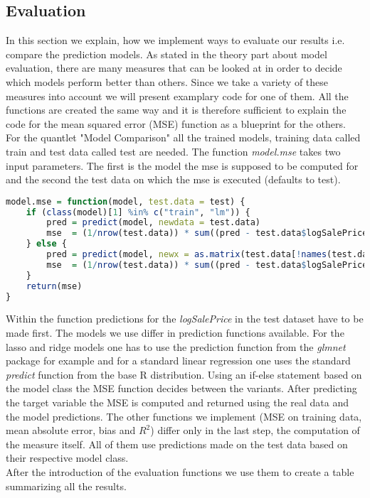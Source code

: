 \subsection{Evaluation}
In this section we explain, how we implement ways to evaluate our results i.e. compare the prediction models. As stated in the theory part about model evaluation, there are many measures that can be looked at in order to decide which models perform better than others. Since we take a variety of these measures into account we will present examplary code for one of them. All the functions are created the same way and it is therefore sufficient to explain the code for the mean squared error (MSE) function as a blueprint for the others. \\
For the quantlet "Model Comparison" all the trained models, training data called train and test data called test are needed. The function \textit{model.mse} takes two input parameters. The first is the model the mse is supposed to be computed for and the second the test data on which the mse is executed (defaults to test). 
\begin{lstlisting}[language=R]
model.mse = function(model, test.data = test) {
    if (class(model)[1] %in% c("train", "lm")) {
        pred = predict(model, newdata = test.data)
        mse  = (1/nrow(test.data)) * sum((pred - test.data$logSalePrice)^2)
    } else {
        pred = predict(model, newx = as.matrix(test.data[!names(test.data) %in% "logSalePrice"]), s = "lambda.1se")
        mse  = (1/nrow(test.data)) * sum((pred - test.data$logSalePrice)^2)
    }
    return(mse)
}
\end{lstlisting}
Within the function predictions for the \textit{logSalePrice} in the test dataset have to be made first. The models we use differ in prediction functions available. For the lasso and ridge models one has to use the prediction function from the \textit{glmnet} package for example and for a standard linear regression one uses the standard \textit{predict} function from the base \textsf{R} distribution. Using an if-else statement based on the model class the MSE function decides between the variants. After predicting the target variable the MSE is computed and returned using the real data and the model predictions. The other functions we implement (MSE on training data, mean absolute error, bias and $R^2$) differ only in the last step, the computation of the measure itself. All of them use predictions made on the test data based on their respective model class. \\
After the introduction of the evaluation functions we use them to create a table summarizing all the results.
